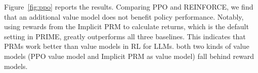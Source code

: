 





Figure~\ref{fig:ppo} reports the results. 
Comparing PPO and REINFORCE, we find that an additional value model does not benefit policy performance. 
Notably, using rewards from the Implicit PRM to calculate returns, which is the default setting in PRIME, greatly outperforms all three baselines. This indicates that PRMs work better than value models in RL for LLMs.
both two kinds of value models (PPO value model and Implicit PRM as value model) fall behind reward models. 



